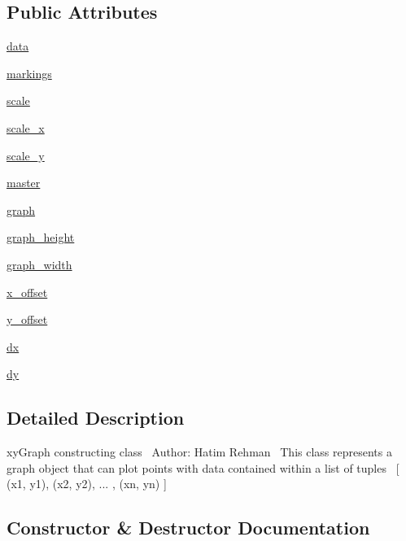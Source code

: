\subsection*{Public Attributes}
\begin{DoxyCompactItemize}
\item 
\hyperlink{class_graph_1_1_graph_a94a0ef0f03a0dd24dea82e3ef2b7d6e1}{data}
\item 
\hyperlink{class_graph_1_1_graph_a2b6f5b97b6e3bbc3f4892f61f2e4c13e}{markings}
\item 
\hyperlink{class_graph_1_1_graph_a8f6efbd0a24558179bc5de2f1c5c8915}{scale}
\item 
\hyperlink{class_graph_1_1_graph_a39b2fad1286b410b3a79cf3a46cd4025}{scale\+\_\+x}
\item 
\hyperlink{class_graph_1_1_graph_ab146d2a4d40f06f6f6a3898d9f86698e}{scale\+\_\+y}
\item 
\hyperlink{class_graph_1_1_graph_a40721968f5bd764c0bf522441d4d190b}{master}
\item 
\hyperlink{class_graph_1_1_graph_a8864e0afea9463d5f7c19d0db528a398}{graph}
\item 
\hyperlink{class_graph_1_1_graph_a5b96246e91f3e2ccf0f19119848b9f61}{graph\+\_\+height}
\item 
\hyperlink{class_graph_1_1_graph_a9d1f6105ebc5552ee56febfd95e8ff30}{graph\+\_\+width}
\item 
\hyperlink{class_graph_1_1_graph_a037f73f95af8e580f546257afff16321}{x\+\_\+offset}
\item 
\hyperlink{class_graph_1_1_graph_a72faf5fc9b08ce6745dac6969624a8a6}{y\+\_\+offset}
\item 
\hyperlink{class_graph_1_1_graph_ae8bb0a1d151b76635aa701867fa2e838}{dx}
\item 
\hyperlink{class_graph_1_1_graph_aa67b439573e876a230b291eed8314b22}{dy}
\end{DoxyCompactItemize}


\subsection{Detailed Description}
xy\+Graph constructing class~\newline
 Author\+: Hatim Rehman~\newline
 This class represents a graph object that can plot points with data contained within a list of tuples~\newline
\mbox{[} (x1, y1), (x2, y2), ... , (xn, yn) \mbox{]} 

\subsection{Constructor \& Destructor Documentation}
\hypertarget{class_graph_1_1_graph_af0cdc046d29cdf27c5f94445132d7cd8}{}\label{class_graph_1_1_graph_af0cdc046d29cdf27c5f94445132d7cd8} 
